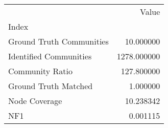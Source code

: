 \begin{tabular}{lr}
\toprule
{} &        Value \\
Index                    &              \\
\midrule
Ground Truth Communities &    10.000000 \\
Identified Communities   &  1278.000000 \\
Community Ratio          &   127.800000 \\
Ground Truth Matched     &     1.000000 \\
Node Coverage            &    10.238342 \\
NF1                      &     0.001115 \\
\bottomrule
\end{tabular}
